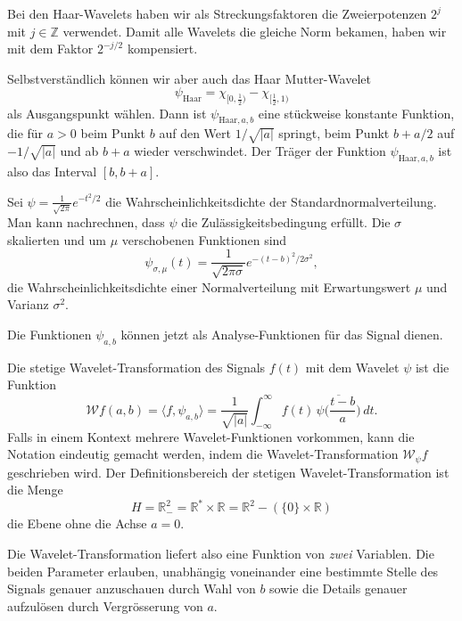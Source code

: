 \begin{beispiel}
Bei den Haar-Wavelets haben wir als Streckungsfaktoren die Zweierpotenzen
$2^j$ mit $j\in\mathbb Z$ verwendet.
Damit alle Wavelets die gleiche Norm bekamen, haben wir mit dem Faktor
$2^{-j/2}$ kompensiert.

Selbstverständlich können wir aber auch das Haar Mutter-Wavelet
\[
\psi_{\text{Haar}} = \chi_{[0,\frac12)} - \chi_{[\frac12,1)}
\]
als Ausgangspunkt wählen.
Dann ist $\psi_{\text{Haar},a,b}$ eine stückweise konstante Funktion,
die für $a>0$ beim Punkt $b$ auf den Wert $1/\sqrt{|a|}$ springt,
beim Punkt $b+a/2$ auf $-1/\sqrt{|a|}$ und ab $b+a$ wieder verschwindet.
Der Träger der Funktion $\psi_{\text{Haar},a,b}$ ist also das Interval
$[b,b+a]$.
\end{beispiel}

\begin{beispiel}
Sei $\psi=\frac1{\sqrt{2\pi}} e^{-t^2/2}$ die Wahrscheinlichkeitsdichte
der Standardnormalverteilung.
Man kann nachrechnen, dass $\psi$ die Zulässigkeitsbedingung erfüllt.
Die $\sigma$ skalierten und um $\mu$ verschobenen Funktionen sind
\[
\psi_{\sigma,\mu}(t)
=
\frac{1}{\sqrt{2\pi\sigma}} e^{-(t-b)^2/2\sigma^2},
\]
die Wahrscheinlichkeitsdichte einer Normalverteilung mit Erwartungswert $\mu$
und Varianz $\sigma^2$.
\end{beispiel}

Die Funktionen $\psi_{a,b}$ können jetzt als Analyse-Funktionen für das
Signal dienen.

\begin{definition}
\label{cwt:definition}
Die stetige Wavelet-Transformation des Signals $f(t)$ mit dem Wavelet
$\psi$ ist die Funktion
\begin{equation}
\mathcal{W}f (a,b)
=
\langle f,\psi_{a,b}\rangle
=
\frac{1}{\sqrt{|a|}}\int_{-\infty}^\infty f(t)\,\overline{
\psi\biggl(\frac{t-b}{a}\biggr)}\,dt.
\label{cwt:definition:eq}
\end{equation}
Falls in einem Kontext mehrere Wavelet-Funktionen vorkommen, kann die
Notation eindeutig gemacht werden, indem die Wavelet-Transformation
$\mathcal{W}_{\psi}f$ geschrieben wird.
Der Definitionsbereich der stetigen Wavelet-Transformation ist die Menge
\[
H
=
\mathbb R^2_-
=
\mathbb R^*\times \mathbb R
=
\mathbb R^2 - (\{0\}\times \mathbb R)
\]
die Ebene ohne die Achse $a=0$.
\end{definition}

Die Wavelet-Transformation liefert also eine Funktion von {\em zwei}
Variablen.
Die beiden Parameter erlauben, unabhängig voneinander eine bestimmte
Stelle des Signals genauer anzuschauen durch Wahl von $b$ sowie die
Details genauer aufzulösen durch Vergrösserung von $a$.

